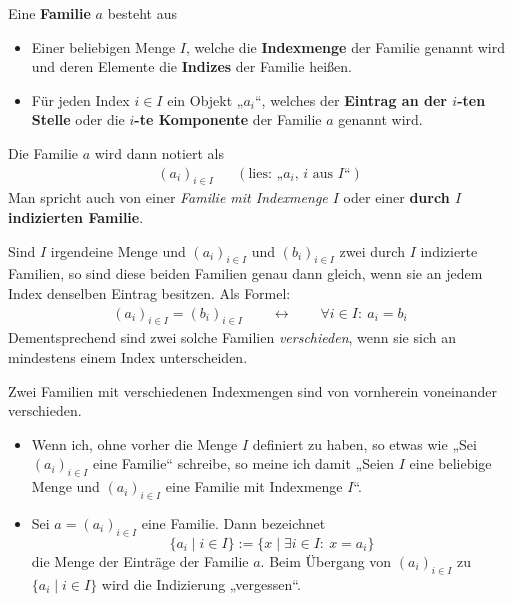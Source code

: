 \begin{de}[Familien] \label{def:familie}   
    Eine \textbf{Familie} $a$ besteht aus
    \begin{itemize}
        \item Einer beliebigen Menge $I$, welche die \textbf{Indexmenge} der Familie genannt wird und deren Elemente die \textbf{Indizes} der Familie heißen.
        \item Für jeden Index $i\in I$ ein Objekt „$a_i$“, welches der \textbf{Eintrag an der $i$-ten Stelle} oder die \textbf{$i$-te Komponente} der Familie $a$ genannt wird.
    \end{itemize}
    Die Familie $a$ wird dann notiert als
    \begin{align*}
        (a_i)_{i\in I} && (\text{lies: „$a_i$, $i$ aus $I$“})
    \end{align*}
    Man spricht auch von einer \emph{Familie mit Indexmenge $I$} oder einer \textbf{durch $I$ indizierten Familie}.
\end{de}


\begin{axiom} \label{familiengleich}
    Sind $I$ irgendeine Menge und $(a_i)_{i\in I}$ und $(b_i)_{i\in I}$ zwei durch $I$ indizierte Familien, so sind diese beiden Familien genau dann gleich, wenn sie an jedem Index denselben Eintrag besitzen. Als Formel:
    \begin{align*}
        (a_i)_{i\in I}=(b_i)_{i\in I} \qquad\leftrightarrow\qquad \forall i\in I:\ a_i=b_i
    \end{align*}
    Dementsprechend sind zwei solche Familien \emph{verschieden}, wenn sie sich an mindestens einem Index unterscheiden.
    
    Zwei Familien mit verschiedenen Indexmengen sind von vornherein voneinander verschieden.
\end{axiom}


\begin{nota} \label{mengeeinerfamilie} \quad
    \begin{itemize}
        \item Wenn ich, ohne vorher die Menge $I$ definiert zu haben, so etwas wie „Sei $(a_i)_{i\in I}$ eine Familie“ schreibe, so meine ich damit „Seien $I$ eine beliebige Menge und $(a_i)_{i\in I}$ eine Familie mit Indexmenge $I$“.
        \item Sei $a=(a_i)_{i\in I}$ eine Familie. Dann bezeichnet
            \[ \{a_i \mid i\in I\} := \{x\mid \exists i\in I:\ x=a_i \} \]
        die Menge der Einträge der Familie $a$. Beim Übergang von $(a_i)_{i\in I}$ zu $\{a_i\mid i\in I\}$ wird die Indizierung „vergessen“.
    \end{itemize}
\end{nota}


